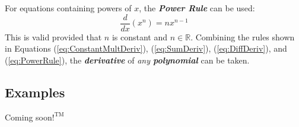 \vspace{0.1in}
For equations containing powers of $x$, the \textbf{\textit{Power Rule}} can be used:
\begin{equation}
\label{eq:PowerRule}
\frac{d}{dx}\left(x^n\right) = nx^{n-1}
\end{equation}
This is valid provided that $n$ is constant and $n \in \mathbb{R}$. Combining the rules shown in Equations (\ref{eq:ConstantMultDeriv}), (\ref{eq:SumDeriv}), (\ref{eq:DiffDeriv}), and (\ref{eq:PowerRule}), the \textbf{\textit{derivative}} of \textit{any \textbf{polynomial}} can be taken.

\begin{center}
\section*{\small Examples}
Coming soon$!^{\text{TM}}$
\end{center}

